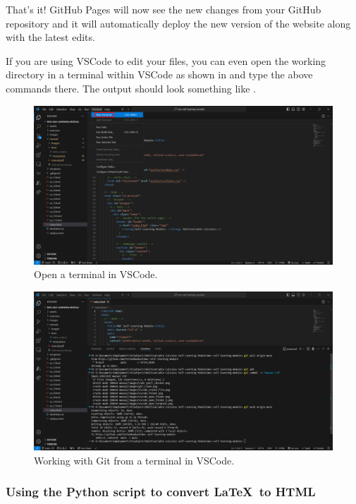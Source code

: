 \documentclass[a4paper,10pt]{article}
\begin{document}
That's it! GitHub Pages will now see the new changes from your GitHub repository and it will automatically deploy the new version of the website along with the latest edits. 

If you are using VSCode to edit your files, you can even open the working directory in a terminal within VSCode as shown in  and type the above commands there. The output should look something like .

\begin{figure}[htbp]
    \centering
    \includegraphics[width=\textwidth]{vscode_open_terminal.png}
    \caption{Open a terminal in VSCode.}
    \label{fig:vscode_open_terminal}   
\end{figure}

\begin{figure}[htbp]
    \centering
    \includegraphics[width=\textwidth]{usage.png}
    \caption{Working with Git from a terminal in VSCode.}
    \label{fig:usage}   
\end{figure}

\subsubsection{Using the Python script to convert \LaTeX\ to HTML}
\end{document}
